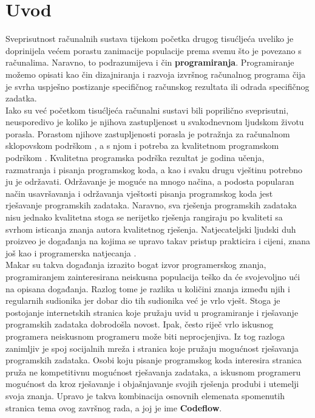 \documentclass[times, utf8, zavrsni]{fer}
\begin{document}
	\chapter{Uvod}
	Sveprisutnost računalnih sustava tijekom početka drugog tisućljeća uveliko je doprinijela većem porastu zanimacije populacije prema svemu što je povezano s računalima.  Naravno, to podrazumijeva i čin \textbf{programiranja}. Programiranje možemo opisati kao čin dizajniranja i razvoja izvršnog računalnog programa čija je svrha uspješno postizanje specifičnog računskog rezultata ili odrada specifičnog zadatka.\\
	Iako su već početkom tisućljeća računalni sustavi bili poprilično sveprisutni, neusporedivo je koliko je njihova zastupljenost u svakodnevnom ljudskom životu porasla. Porastom njihove zastupljenosti porasla je potražnja za računalnom sklopovskom podrškom , a s njom i potreba za kvalitetnom programskom podrškom . Kvalitetna programska podrška rezultat je godina učenja, razmatranja i pisanja programskog koda, a kao i svaku drugu vještinu potrebno ju je održavati. Održavanje je moguće na mnogo načina, a podosta popularan način usavršavanja i održavanja vještosti pisanja programskog koda jest rješavanje programskih zadataka. Naravno, sva rješenja programskih zadataka nisu jednako kvalitetna stoga se nerijetko rješenja rangiraju po kvaliteti sa svrhom isticanja znanja autora kvalitetnog rješenja. Natjecateljski ljudski duh proizveo je događanja na kojima se upravo takav pristup prakticira i cijeni, znana još kao i programerska natjecanja .\\
	Makar su takva događanja izrazito bogat izvor programerskog znanja, programiranjem zainteresirana neiskusna populacija teško da će svojevoljno ući na opisana događanja. Razlog tome je razlika u količini znanja između njih i regularnih sudionika jer dobar dio tih sudionika već je vrlo vješt. Stoga je postojanje internetskih stranica koje pružaju uvid u programiranje i rješavanje programskih zadataka dobrodošla novost. Ipak, često riječ vrlo iskusnog programera neiskusnom programeru može biti neprocjenjiva. Iz tog razloga zanimljiv je spoj socijalnih mreža  i stranica koje pružaju mogućnost rješavanja programskih zadataka. Osobi koju pisanje programskog koda interesira stranica pruža ne kompetitivnu mogućnost rješavanja zadataka, a iskusnom programeru mogućnost da kroz rješavanje i objašnjavanje svojih rješenja produbi i utemelji svoja znanja. Upravo je takva kombinacija osnovnih elemenata spomenutih stranica tema ovog završnog rada, a joj je ime \textbf{Codeflow}.
	
\end{document}
